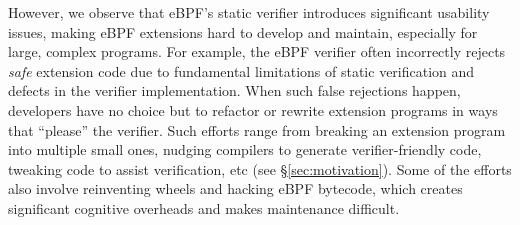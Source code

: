 However, we observe that eBPF's static verifier introduces
    significant usability issues, %
    making eBPF extensions
    hard to develop and maintain, especially for large, complex programs.
For example, the eBPF verifier often incorrectly
    rejects {\it safe} extension code due to fundamental limitations of static verification
    and defects in the verifier implementation.
When such false rejections happen,
    developers have no choice but to refactor or rewrite extension programs
    in ways that ``please'' the verifier.
Such efforts range from breaking an extension program into multiple small ones,
    nudging compilers to generate verifier-friendly code, tweaking code
    to assist verification, etc (see \S\ref{sec:motivation}).
Some of the efforts also involve reinventing wheels and hacking eBPF bytecode,
    which creates significant cognitive overheads and
    makes maintenance difficult.



